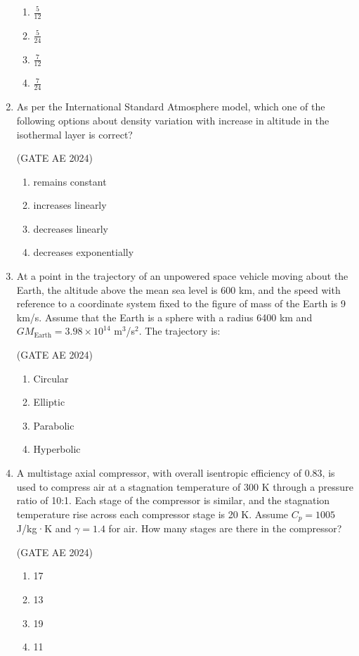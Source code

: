 \documentclass[journal,12pt,onecolumn]{IEEEtran}
\theoremstyle{remark}
\begin{document}
\begin{flushleft}
\begin{enumerate}
\begin{enumerate}
   \item $\frac{5}{12}$
    \item $\frac{5}{24}$
    \item $\frac{7}{12}$
    \item $\frac{7}{24}$
\end{enumerate}
   
\item As per the International Standard Atmosphere model, which one of the following options about density variation with increase in altitude in the isothermal layer is correct?

\hfill (GATE AE 2024)

\begin{enumerate}
 \item remains constant
 \item increases linearly
 \item decreases linearly
 \item decreases exponentially
\end{enumerate}

\item At a point in the trajectory of an unpowered space vehicle moving about the Earth, the altitude above the mean sea level is 600 km, and the speed with reference to a coordinate system fixed to the figure of mass of the Earth is 9 km/s. Assume that the Earth is a sphere with a radius 6400 km and $GM_{\text{Earth}} = 3.98 \times 10^{14}$ m$^3$/s$^2$. The trajectory is:

\hfill (GATE AE 2024)

\begin{enumerate}
\item Circular
\item Elliptic
\item Parabolic
\item Hyperbolic
\end{enumerate}
  

\item  A multistage axial compressor, with overall isentropic efficiency of 0.83, is used to compress air at a stagnation temperature of 300 K through a pressure ratio of 10:1. Each stage of the compressor is similar, and the stagnation temperature rise across each compressor stage is 20 K. Assume $C_p = 1005$ J/kg·K and $\gamma = 1.4$ for air. How many stages are there in the compressor?

\hfill (GATE AE 2024)

\begin{enumerate}
    \item 17
    \item 13
    \item 19
    \item 11
\end{enumerate}


\end{enumerate}
\end{flushleft}
\end{document}
